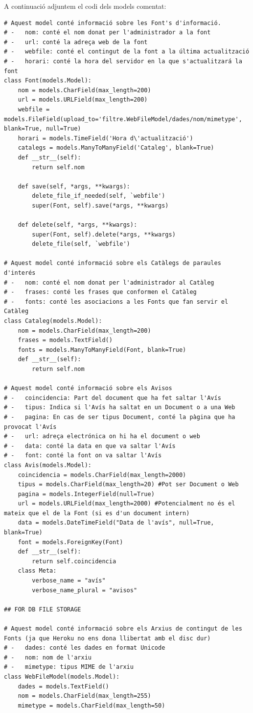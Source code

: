 \documentclass{article}
\begin{document}
\newpage

A continuació adjuntem el codi dels models comentat:

\begin{lstlisting}
# Aquest model conté informació sobre les Font's d'informació.
# -   nom: conté el nom donat per l'administrador a la font
# -   url: conté la adreça web de la font
# -   webfile: conté el contingut de la font a la última actualització
# -   horari: conté la hora del servidor en la que s'actualitzará la font
class Font(models.Model):
    nom = models.CharField(max_length=200)
    url = models.URLField(max_length=200)
    webfile = models.FileField(upload_to='filtre.WebFileModel/dades/nom/mimetype', blank=True, null=True)
    horari = models.TimeField('Hora d\'actualització')
    catalegs = models.ManyToManyField('Cataleg', blank=True)
    def __str__(self):
        return self.nom

    def save(self, *args, **kwargs):
        delete_file_if_needed(self, `webfile')
        super(Font, self).save(*args, **kwargs)

    def delete(self, *args, **kwargs):
        super(Font, self).delete(*args, **kwargs)
        delete_file(self, `webfile')

# Aquest model conté informació sobre els Catàlegs de paraules d'interés
# -   nom: conté el nom donat per l'administrador al Catàleg
# -   frases: conté les frases que conformen el Catàleg
# -   fonts: conté les asociacions a les Fonts que fan servir el Catàleg
class Cataleg(models.Model):
    nom = models.CharField(max_length=200)
    frases = models.TextField()
    fonts = models.ManyToManyField(Font, blank=True)
    def __str__(self):
        return self.nom

# Aquest model conté informació sobre els Avisos
# -   coincidencia: Part del document que ha fet saltar l'Avís
# -   tipus: Indica si l'Avís ha saltat en un Document o a una Web
# -   pagina: En cas de ser tipus Document, conté la pàgina que ha provocat l'Avís
# -   url: adreça electrónica on hi ha el document o web
# -   data: conté la data en que va saltar l'Avís
# -   font: conté la font on va saltar l'Avís
class Avis(models.Model):
    coincidencia = models.CharField(max_length=2000)
    tipus = models.CharField(max_length=20) #Pot ser Document o Web
    pagina = models.IntegerField(null=True)
    url = models.URLField(max_length=2000) #Potencialment no és el mateix que el de la Font (si es d'un document intern)
    data = models.DateTimeField("Data de l'avís", null=True, blank=True)
    font = models.ForeignKey(Font)
    def __str__(self):
        return self.coincidencia
    class Meta:
        verbose_name = "avís"
        verbose_name_plural = "avisos"

## FOR DB FILE STORAGE

# Aquest model conté informació sobre els Arxius de contingut de les Fonts (ja que Heroku no ens dona llibertat amb el disc dur)
# -   dades: conté les dades en format Unicode
# -   nom: nom de l'arxiu
# -   mimetype: tipus MIME de l'arxiu
class WebFileModel(models.Model):
    dades = models.TextField()
    nom = models.CharField(max_length=255)
    mimetype = models.CharField(max_length=50)
\end{lstlisting}
\end{document}
